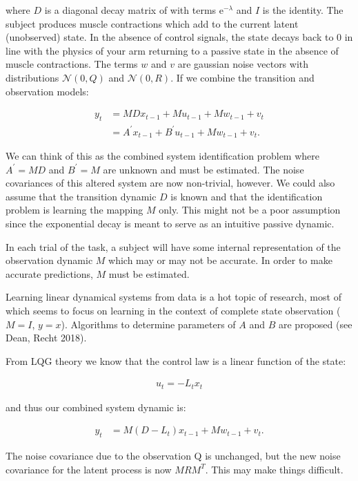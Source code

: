 \documentclass[
  a4paper,
]{article}
\begin{document}
where \(D\) is a diagonal decay matrix of with terms
\(\mathrm{e}^{-\lambda}\) and \(I\) is the identity. The subject
produces muscle contractions which add to the current latent
(unobserved) state. In the absence of control signals, the state decays
back to \(0\) in line with the physics of your arm returning to a
passive state in the absence of muscle contractions. The terms \(w\) and
\(v\) are gaussian noise vectors with distributions \(\mathcal{N}(0,Q)\)
and \(\mathcal{N}(0,R)\). If we combine the transition and observation
models:

\[
\begin{align*}
y_t &= MDx_{t-1} + Mu_{t-1} + Mw_{t-1} + v_t \\
&= A^\prime x_{t-1} + B^\prime u_{t-1} + Mw_{t-1} + v_t.
\end{align*}
\]

We can think of this as the combined system identification problem where
\(A^\prime=MD\) and \(B^\prime=M\) are unknown and must be estimated.
The noise covariances of this altered system are now non-trivial,
however. We could also assume that the transition dynamic \(D\) is known
and that the identification problem is learning the mapping \(M\) only.
This might not be a poor assumption since the exponential decay is meant
to serve as an intuitive passive dynamic.

In each trial of the task, a subject will have some internal
representation of the observation dynamic \(M\) which may or may not be
accurate. In order to make accurate predictions, \(M\) must be
estimated.

Learning linear dynamical systems from data is a hot topic of research,
most of which seems to focus on learning in the context of complete
state observation (\(M=I\), \(y=x\)). Algorithms to determine parameters
of \(A\) and \(B\) are proposed (see Dean, Recht 2018).

From LQG theory we know that the control law is a linear function of the
state:

\[
\begin{align*}
u_t = -L_tx_t
\end{align*}
\]

and thus our combined system dynamic is:

\[
\begin{align*}
y_t &= M(D-L_t)x_{t-1} + Mw_{t-1} + v_t.
\end{align*}
\]

The noise covariance due to the observation Q is unchanged, but the new
noise covariance for the latent process is now \(MRM^T\). This may make
things difficult.
\end{document}
